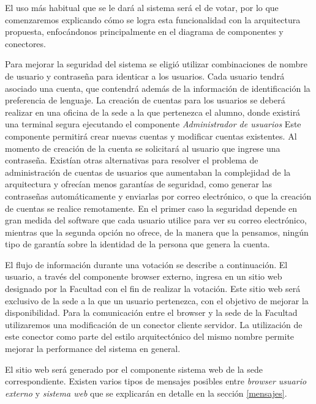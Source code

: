 El uso más habitual que se le dará al sistema será el de votar, por lo que comenzaremos explicando cómo se logra esta funcionalidad con la arquitectura propuesta, enfocándonos principalmente en el diagrama de componentes y conectores.


Para mejorar la seguridad del sistema se eligió utilizar combinaciones de nombre de usuario y contraseña para identicar a los usuarios. Cada usuario tendrá asociado una cuenta, que contendrá además de la información de identificación la preferencia de lenguaje. La creación de cuentas para los usuarios se deberá realizar en una oficina de la sede a la que pertenezca el alumno, donde existirá una terminal segura ejecutando el componente \emph{Administrador de usuarios} Este componente permitirá crear nuevas cuentas y modificar cuentas existentes. Al momento de creación de la cuenta se solicitará al usuario que ingrese una contraseña. Existían otras alternativas para resolver el problema de administración de cuentas de usuarios que aumentaban la complejidad de la arquitectura y ofrecían menos garantías de seguridad, como generar las contraseñas automáticamente y enviarlas por correo electrónico, o que la creación de cuentas se realice remotamente. En el primer caso la seguridad depende en gran medida del software que cada usuario utilice para ver su correo electrónico, mientras que la segunda opción no ofrece, de la manera que la pensamos, ningún tipo de garantía sobre la identidad de la persona que genera la cuenta.

El flujo de información durante una votación se describe a continuación. El usuario, a través del componente browser externo, ingresa en un sitio web designado por la Facultad con el fin de realizar la votación.  Este sitio web será exclusivo de la sede a la que un usuario pertenezca, con el objetivo de mejorar la disponibilidad. Para la comunicación entre el browser y la sede de la Facultad utilizaremos una modificación de un conector cliente servidor. La utilización de este conector como parte del estilo arquitectónico del mismo nombre permite mejorar la performance del sistema en general.

El sitio web será generado por el componente sistema web de la sede correspondiente. Existen varios tipos de mensajes posibles entre \emph{browser usuario externo} y \emph{sistema web} que se explicarán en detalle en la sección \ref{mensajes}. 

